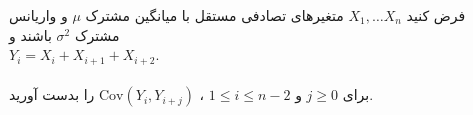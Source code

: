 \problem{}
\subproblem{}
فرض کنید \( X_1, \dots X_n\) متغیرهای تصادفی مستقل با میانگین مشترک 
\( \mu \) و واریانس مشترک \( \sigma^2 \) باشند و 
\\ \( Y_i = X_i + X_{i+1} + X_{i+2} \). \\\\
برای \( j \geq 0 \)  و  \( 1 \leq i \leq n-2\) ،  \( \text{Cov}(Y_i, Y_{i+j}) \) را بدست آورید.